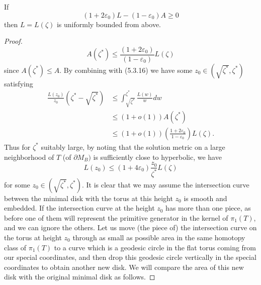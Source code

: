 \begin{lemma}
  \label{lem:cz-hyperbolic-cusp-length-bounded}
If
$$
(1+2\varepsilon_0)L-(1-\varepsilon_0)A\geq 0
$$
then $L=L(\zeta)$ is uniformly bounded from above.

\end{lemma}
\begin{proof}
$$
A(\zeta^{\ast})\leq
\frac{(1+2\varepsilon_0)}{(1-\varepsilon_0)}L(\zeta)
$$
since $A(\zeta^{\ast})\leq A$. By combining with (5.3.16) we have
some $z_0\in (\sqrt{\zeta^{\ast}},\zeta^{\ast})$ satisfying
\begin{align*}
\frac{L(z_0)}{z_0}\left(\zeta^{\ast}-\sqrt{\zeta^{\ast}}\right)&  \leq
\int_{\sqrt{\zeta^{\ast}}}^{\zeta^{\ast}} \frac{L(w)}{w}dw \\
&  \leq  (1+o(1))A(\zeta^{\ast}) \\
&  \leq
(1+o(1))\left(\frac{1+2\varepsilon_0}{1-\varepsilon_0}\right)L(\zeta).
\end{align*}
Thus for $\zeta^{\ast}$ suitably large, by noting that the
solution metric on a large neighborhood of $T$ (of $\partial
{M}_B)$ is sufficiently close to hyperbolic, we have \begin{equation}
L(z_0)\leq (1+4\varepsilon_0)\frac{z_0}{\zeta^{\ast}}L(\zeta)
\end{equation} for some $z_0\in (\sqrt{\zeta^{\ast}},\zeta^{\ast})$. It is
clear that we may assume the intersection curve between the
minimal disk with the torus at this height $z_0$ is smooth and
embedded. If the intersection curve at the height $z_0$ has more
than one piece, as before one of them will represent the primitive
generator in the kernel of $\pi_1(T)$, and we can ignore the
others. Let us move (the piece of) the intersection curve on the
torus at height $z_0$ through as small as possible area in the
same homotopy class of $\pi_1(T)$ to a curve which is a geodesic
circle in the flat torus coming from our special coordinates, and
then drop this geodesic circle vertically in the special
coordinates to obtain another new disk. We will compare the area
of this new disk with the original minimal disk as follows.


\end{proof}
